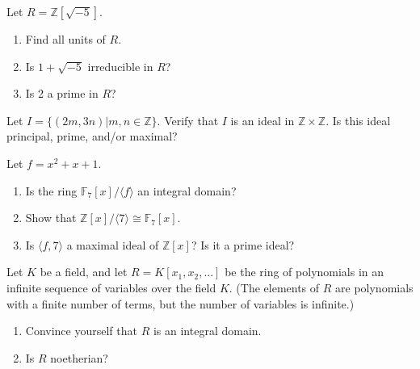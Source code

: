 \documentclass[12pt,letterpaper,boxed]{hmcpset}
\begin{document}

\begin{problem}[18.1.21]
Let $R = \mathbb{Z}[\sqrt{-5}]$.
\begin{enumerate}[label=\alph*]
\item Find all units of $R$.
\item Is $1 + \sqrt{-5}$ irreducible in $R$?
\item Is 2 a prime in $R$?
\end{enumerate}
\end{problem}

\begin{solution}
\end{solution}

\clearpage

\begin{problem}[18.1.24]
Let $I = \{(2m,3n) \vert m,n \in \mathbb{Z}\}$. Verify that $I$ is an ideal in $\mathbb{Z} \times \mathbb{Z}$. Is this ideal principal, prime, and/or maximal?
\end{problem}

\begin{solution}
\end{solution}

\clearpage

\begin{problem}[18.1.29]
Let $f = x^2 + x + 1$.
\begin{enumerate}[label=\alph*]
\item Is the ring $\mathbb{F}_7[x]/\langle f \rangle$ an integral domain?
\item Show that $\mathbb{Z}[x]/\langle 7 \rangle \cong \mathbb{F}_7[x]$.
\item Is $\langle f,7 \rangle $ a maximal ideal of $\mathbb{Z}[x]$? Is it a prime ideal?
\end{enumerate}
\end{problem}

\begin{solution}
\end{solution}

\clearpage

\begin{problem}[18.2.5]
Let $K$ be a field, and let $R = K[x_1,x_2,...]$ be the ring of polynomials in an infinite sequence of variables over the field $K$. (The elements of $R$ are polynomials with a finite number of terms, but the number of variables is infinite.)
\begin{enumerate}[label=\alph*]
\item Convince yourself that $R$ is an integral domain.
\item Is $R$ noetherian?
\end{enumerate}
\end{problem}
\end{document}
